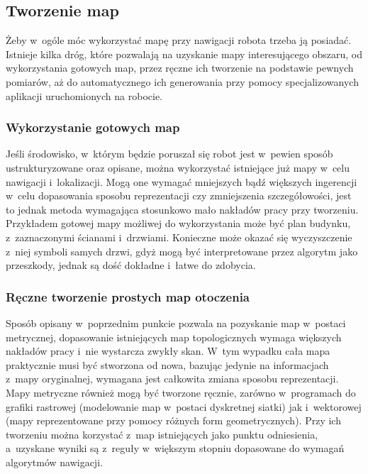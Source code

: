 \subsection{Tworzenie map}

Żeby w~ogóle móc wykorzystać mapę przy nawigacji robota trzeba ją posiadać.
Istnieje kilka dróg, które pozwalają na uzyskanie mapy interesującego obszaru,
od wykorzystania gotowych map, przez ręczne ich tworzenie na podstawie pewnych
pomiarów, aż do automatycznego ich generowania przy pomocy specjalizowanych
aplikacji uruchomionych na robocie.

\subsubsection{Wykorzystanie gotowych map}

Jeśli środowisko, w~którym będzie poruszał się robot jest w~pewien sposób
ustrukturyzowane oraz opisane, można wykorzystać istniejące już mapy w~celu
nawigacji i~lokalizacji. Mogą one wymagać mniejszych bądź większych ingerencji
w~celu dopasowania sposobu reprezentacji czy zmniejszenia szczegółowości,
jest to jednak metoda wymagająca stosunkowo mało nakładów pracy przy tworzeniu.
Przykładem gotowej mapy możliwej do wykorzystania może być plan budynku,
z~zaznaczonymi ścianami i~drzwiami. Konieczne może okazać się wyczyszczenie
z~niej symboli samych drzwi, gdyż mogą być interpretowane przez algorytm
jako przeszkody, jednak są dość dokładne i~łatwe do zdobycia.

\subsubsection{Ręczne tworzenie prostych map otoczenia}

Sposób opisany w~poprzednim punkcie pozwala na pozyskanie map w~postaci metrycznej,
dopasowanie istniejących map topologicznych wymaga większych nakładów pracy
i~nie wystarcza zwykły skan. W~tym wypadku cała mapa praktycznie musi być
stworzona od nowa, bazując jedynie na informacjach z~mapy oryginalnej, wymagana
jest całkowita zmiana sposobu reprezentacji. Mapy metryczne również mogą być
tworzone ręcznie, zarówno w~programach do grafiki rastrowej (modelowanie map
w~postaci dyskretnej siatki) jak i~wektorowej (mapy reprezentowane przy pomocy
różnych form geometrycznych). Przy ich tworzeniu można korzystać z~map istniejących
jako punktu odniesienia, a~uzyskane wyniki są z~reguły w~większym stopniu
dopasowane do wymagań algorytmów nawigacji.


